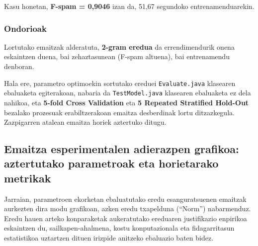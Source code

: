 \documentclass[12pt, a4paper]{article}
\begin{document}
Kasu honetan, \textbf{F-spam = 0,9046} izan da, 51,67 segundoko entrenamenduarekin.


\begin{table}[h!]
\centering
\caption{Fine-tuning eredu onenen konparaketa}
\end{table}

\subsubsection*{Ondorioak}
Lortutako emaitzak alderatuta, \textbf{2-gram eredua} da errendimendurik onena eskaintzen duena, bai zehaztasunean (F-spam altuena), bai entrenamendu denboran.

Hala ere, parametro optimoekin sortutako ereduei \texttt{Evaluate.java} klasearen ebaluaketa egiterakoan, nabaria da \texttt{TestModel.java} klasearen ebaluaketa ez dela nahikoa, eta \textbf{5-fold Cross Validation} eta \textbf{5 Repeated Stratified Hold-Out} bezalako prozesuak erabiltzerakoan emaitza desberdinak lortu ditzazkegula. Zazpigarren atalean emaitza horiek aztertuko ditugu.
\newpage

\subsection{Emaitza esperimentalen adierazpen grafikoa: aztertutako parametroak eta horietarako metrikak}

Jarraian, parametroen ekorketan ebaluatutako eredu esanguratsuenen emaitzak aurkezten dira modu grafikoan, azken eredu txapelduna (``Norm'') nabarmenduz. Eredu hauen arteko konparaketak aukeratutako ereduaren justifikazio enpirikoa eskaintzen du, sailkapen-ahalmena, kostu konputazionala eta fidagarritasun estatistikoa uztartzen dituen irizpide anitzeko ebaluazio baten bidez.
\end{document}
